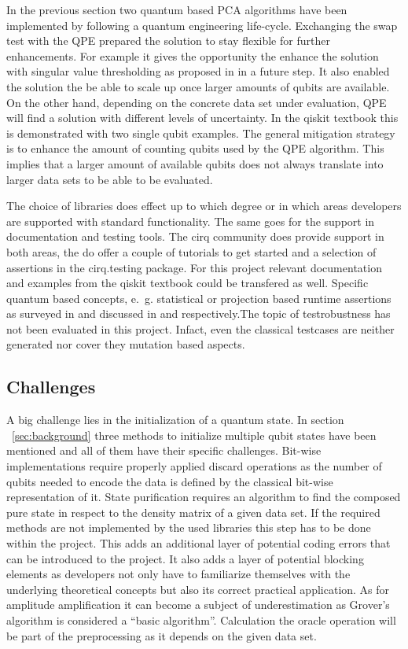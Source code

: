 \noindent
In the previous section two quantum based PCA algorithms have been implemented by following a quantum engineering life-cycle. Exchanging the swap test with the QPE prepared the solution to stay flexible for further enhancements. For example it gives the opportunity the enhance the solution with singular value thresholding as proposed in \cite{He_2021} in a future step. It also enabled the solution the be able to scale up once larger amounts of qubits are available. On the other hand, depending on the concrete data set under evaluation, QPE will find a solution with different levels of uncertainty. In the qiskit textbook \cite{Qtb_Qpe} this is demonstrated with two single qubit examples. The general mitigation strategy is to enhance the amount of counting qubits used by the QPE algorithm. This implies that a larger amount of available qubits does not always translate into larger data sets to be able to be evaluated.

The choice of libraries does effect up to which degree or in which areas developers are supported with standard functionality. The same goes for the support in documentation and testing tools. The cirq community does provide support in both areas, the do offer a couple of tutorials to get started and a selection of assertions in the cirq.testing package. For this project relevant documentation and examples from the qiskit textbook could be transfered as well. Specific quantum based concepts, e.~g. statistical or projection based runtime assertions as surveyed in \cite{Zhao_2020} and discussed in \cite{Huang_2019} and \cite{Li_2019} respectively.The topic of testrobustness has not been evaluated in this project. Infact, even the classical testcases are neither generated nor cover they mutation based aspects.

\subsection{Challenges}
\label{subsec:challenges}
A big challenge lies in the initialization of a quantum state. In section ~\ref{sec:background} three methods to initialize multiple qubit states have been mentioned and all of them have their specific challenges. Bit-wise implementations require properly applied discard operations as the number of qubits needed to encode the data is defined by the classical bit-wise representation of it. State purification requires an algorithm to find the composed pure state in respect to the density matrix of a given data set. If the required methods are not implemented by the used libraries this step has to be done within the project. This adds an additional layer of potential coding errors that can be introduced to the project. It also adds a layer of potential blocking elements as developers not only have to familiarize themselves with the underlying theoretical concepts but also its correct practical application. As for amplitude amplification it can become a subject of underestimation as Grover's algorithm is considered a \enquote{basic algorithm}. Calculation the oracle operation will be part of the preprocessing as it depends on the given data set.

